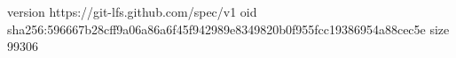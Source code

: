 version https://git-lfs.github.com/spec/v1
oid sha256:596667b28cff9a06a86a6f45f942989e8349820b0f955fcc19386954a88cec5e
size 99306
